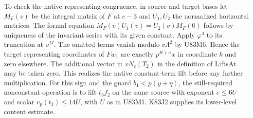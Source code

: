 To check the native representing congruence, in source and target
bases let $M_F(v)$ be the integral matrix of $F$ at $c-3$ and
$U_1,U_2$ the normalized horizontal matrices. The formal equation
$M_F(v)U_1(v)=U_2(v)M_F(0)$ follows by uniqueness of the
invariant series with its given constant. Apply $\varphi^3$
to its truncation at $v^M$. The omitted terms vanish modulo
$v\Lambda^2$ by U83M6. Hence the target representing coordinates
of $Fw_1$ are exactly $p^{R+\sigma}x$ in coordinate $k$ and
zero elsewhere. The additional vector in $vN_c(T_2)$ in the
definition of $\mathrm{LiftsAt}$ may be taken zero.
This realizes the native constant-term lift before any further
multiplication. For this sign and the guard $b_1<p(y+\eta)$,
the still-required nonconstant operation is to lift $t_3f_2$
on the same source with exponent $e\le6U$ and scalar
$v_p(t_3)\le14U$, with $U$ as in U83M1. K83J2 supplies its
lower-level content estimate.
